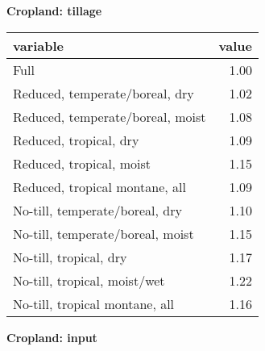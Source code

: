 \documentclass[
]{article}
\newenvironment{Shaded}{\begin{snugshade}}{\end{snugshade}}
\newcommand{\AttributeTok}[1]{\textcolor[rgb]{0.77,0.63,0.00}{#1}}
\newcommand{\DecValTok}[1]{\textcolor[rgb]{0.00,0.00,0.81}{#1}}
\newcommand{\FunctionTok}[1]{\textcolor[rgb]{0.00,0.00,0.00}{#1}}
\newcommand{\NormalTok}[1]{#1}
\newcommand{\OtherTok}[1]{\textcolor[rgb]{0.56,0.35,0.01}{#1}}
\newcommand{\SpecialCharTok}[1]{\textcolor[rgb]{0.00,0.00,0.00}{#1}}
\begin{document}
\textbf{Cropland: tillage}

\begin{Shaded}
\end{Shaded}

\begin{longtable}[]{@{}lr@{}}
\toprule()
variable & value \\
\midrule()
\endhead
Full & 1.00 \\
Reduced, temperate/boreal, dry & 1.02 \\
Reduced, temperate/boreal, moist & 1.08 \\
Reduced, tropical, dry & 1.09 \\
Reduced, tropical, moist & 1.15 \\
Reduced, tropical montane, all & 1.09 \\
No-till, temperate/boreal, dry & 1.10 \\
No-till, temperate/boreal, moist & 1.15 \\
No-till, tropical, dry & 1.17 \\
No-till, tropical, moist/wet & 1.22 \\
No-till, tropical montane, all & 1.16 \\
\bottomrule()
\end{longtable}

\textbf{Cropland: input}

\begin{Shaded}
\end{Shaded}
\end{document}
